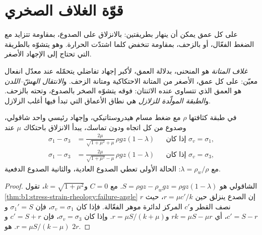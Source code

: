 \section{قوّة الغلاف الصخري}\label{sec:b1:stress-strain-rheology:envelope}

على كل عمق يمكن أن ينهار  بطريقتين: بالانزلاق على الصدوع، بمقاومة تتزايد مع الضغط الفعّال، أو بالزحف، بمقاومة تنخفض كلما اشتدّت الحرارة. وهو يتشوّه بالطريقة التي تحتاج إلى الإجهاد الأصغر.

\begin{definition}\label{def:b1:stress-strain-rheology:strength-envelope}
\emph{غلاف المتانة}  هو المنحنى، بدلالة العمق، لأكبر إجهاد تفاضلي يتحمّله عند معدّل انفعال معيّن: على كل عمق، الأصغر من المتانة الاحتكاكية ومتانة الزحف. و\emph{الانتقال الهشّ--اللدن} هو العمق الذي تتساوى عنده الاثنتان: فوقه يتشوّه الصخر بالصدوع، وتحته بالزحف. و\emph{الطبقة المولّدة للزلازل} هي نطاق الأعماق التي تبدأ فيها أغلب الزلازل.
\end{definition}

\begin{proposition}\label{prop:b1:stress-strain-rheology:brittle-gradient}
في طبقة كثافتها $\rho$ مع ضغط مسام هيدروستاتيكي، وإجهاد رئيسي واحد شاقولي، وصدوع من كل اتجاه ودون تماسك، يبدأ الانزلاق باحتكاك $\mu$ عند 
\begin{align*}
  \sigma_1 - \sigma_3 &= \frac{2\mu}{\sqrt{1+\mu^2} + \mu}\,\rho g z(1-\lambda)
  && \text{إذا كان $\sigma_v = \sigma_1$}, \\
  \sigma_1 - \sigma_3 &= \frac{2\mu}{\sqrt{1+\mu^2} - \mu}\,\rho g z(1-\lambda)
  && \text{إذا كان $\sigma_v = \sigma_3$},
\end{align*}
مع $\lambda = \rho_w/\rho$: الحالة الأولى تعطي الصدوع العادية، والثانية الصدوع الدفعية.
\end{proposition}

\begin{proof}
 الشاقولي هو $S = \rho g z - \rho_w g z = \rho g z(1-\lambda)$.
مع $C = 0$ و$k = \sqrt{1+\mu^2}$، تقول \cref{thm:b1:stress-strain-rheology:failure-angle} إن الصدع ينزلق حين $r = \mu c'/k$، حيث $r$ نصف القطر و$c'$ المركز لدائرة موهر الفعّالة. فإذا كان $\sigma_v = \sigma_1$، فإن $\sigma_1' = S$ و$c' = S - r$، أي $rk = \mu S - \mu r$ و$r = \mu S/(k+\mu)$. وإذا كان $\sigma_v = \sigma_3$، فإن $c' = S + r$ و$r = \mu S/(k-\mu)$.  هو $2r$.
\end{proof}

